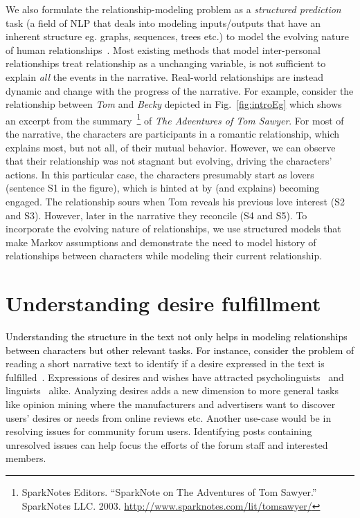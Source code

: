 \documentclass[9.8pt, twocolumn]{article}
\begin{document}
We also formulate the relationship-modeling problem as a \emph{structured prediction} task (a field of NLP that deals into modeling inputs/outputs that have an inherent structure eg. graphs, sequences, trees etc.) to model the evolving nature of human relationships~\cite{rel1}. Most existing methods that model inter-personal relationships treat relationship as a unchanging variable, is not sufficient to explain \emph{all} the events in the narrative. Real-world relationships are instead dynamic and change with the progress of the narrative.  For example, consider the relationship between \emph{Tom} and \emph{Becky} depicted in Fig.~\ref{fig:introEg} which shows an excerpt from the summary~\footnote{SparkNotes Editors. ``SparkNote on The Adventures of Tom Sawyer.'' SparkNotes LLC. 2003. \url{http://www.sparknotes.com/lit/tomsawyer/}} of \emph{The Adventures of Tom Sawyer}. For most of the narrative, the characters are participants in a romantic relationship, which explains most, but not all, of their mutual behavior.  However, we can observe that their relationship was not stagnant but evolving, driving the characters' actions. In this particular case, the characters presumably start as lovers (sentence S1 in the figure), which is hinted at by (and explains) becoming engaged. The relationship sours when Tom reveals his previous love interest (S2 and S3). However, later in the narrative they reconcile (S4 and S5). To incorporate the evolving nature of relationships, we use structured models that make Markov assumptions and demonstrate the need to model history of relationships between characters while modeling their current relationship.

\section{Understanding desire fulfillment}
\textcolor{black}{Understanding the structure in the text not only helps in modeling relationships between characters but other relevant tasks. For instance, consider the problem of }reading a short narrative text to identify if a desire expressed in the text is fulfilled~\cite{desiresACL}. Expressions of desires and wishes have attracted psycholinguists~\cite{Shatz} and linguists~\cite{Barak} alike. Analyzing desires adds a new dimension to more general tasks like opinion mining where the manufacturers and advertisers want to discover users' desires or needs from online reviews etc. Another use-case would be in resolving issues for community forum users. Identifying posts containing unresolved issues can help focus the efforts of the forum staff and interested members. 
\end{document}
